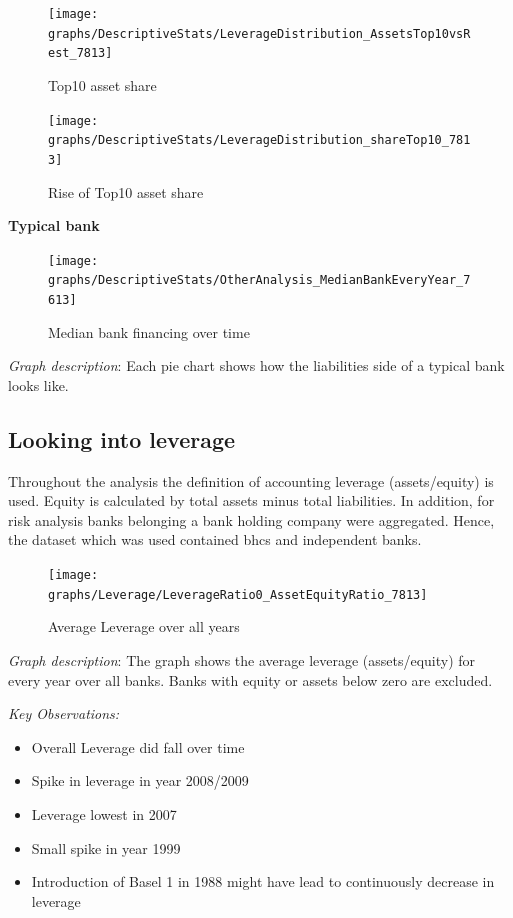 \documentclass[12pt, a4paper]{article} %
\begin{document}
\begin{figure}[hbtp]
\centering
\caption{Top10 asset share}
\texttt{[image: graphs/DescriptiveStats/LeverageDistribution\_AssetsTop10vsRest\_7813]}
\end{figure}


\begin{figure}[hbtp]
\centering
\caption{Rise of Top10 asset share}
\texttt{[image: graphs/DescriptiveStats/LeverageDistribution\_shareTop10\_7813]}
\end{figure}

\textbf{Typical bank}

\begin{figure}[hbtp]
\centering
\caption{Median bank financing over time}
\texttt{[image: graphs/DescriptiveStats/OtherAnalysis\_MedianBankEveryYear\_7613]}
\end{figure}
\noindent \textit{Graph description}: Each pie chart shows how the liabilities side of a typical bank looks like. 

\newpage

\subsection{Looking into leverage}

Throughout the analysis the definition of accounting leverage (assets/equity) is used. Equity is calculated by total assets minus total liabilities. In addition, for risk analysis banks belonging a bank holding company were aggregated. Hence, the dataset which was used contained bhcs and independent banks.

\begin{figure}[hbtp]
\centering
\caption{Average Leverage over all years}
\texttt{[image: graphs/Leverage/LeverageRatio0\_AssetEquityRatio\_7813]}
\end{figure}

\noindent \textit{Graph description}: The graph shows the average leverage (assets/equity) for every year over all banks. Banks with equity or assets below zero are excluded.


\noindent \textit{Key Observations:}
\begin{itemize}
\item Overall Leverage did fall over time
\item Spike in leverage in year 2008/2009
\item Leverage lowest in 2007
\item Small spike in year 1999
\item Introduction of Basel 1 in 1988 might have lead to continuously decrease in leverage
\end{itemize}
\end{document}
